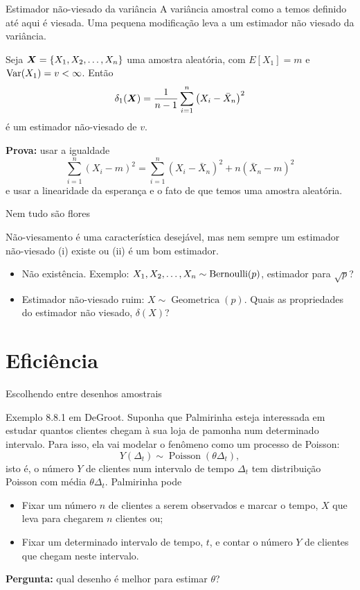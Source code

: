 \begin{frame}{Estimador não-viesado da variância}
A variância amostral como a temos definido até aqui é viesada. 
Uma pequena modificação leva a um estimador não viesado da variância.
\begin{theo}
 Seja $\boldsymbol{X} = \{ X_1, X_2, \ldots, X_n \}$ uma amostra aleatória, com $E[X_1] = m$ e $\operatorname{Var}(X_1) = v < \infty$.
 Então
 \begin{equation*}
  \delta_1(\boldsymbol{X}) = \frac{1}{n-1} \sum_{i=1}^n \left(X_i - \bar{X}_n \right)^2
 \end{equation*}
é um estimador não-viesado de $v$.
\end{theo}
\textbf{Prova:} usar a igualdade
$$ \sum_{i=1}^n \left(X_i - m \right)^2 = \sum_{i=1}^n \left(X_i - \bar{X}_n \right)^2 + n\left(\bar{X}_n - m \right)^2$$
e usar a linearidade da esperança e o fato de que temos uma amostra aleatória.
\end{frame}

\begin{frame}{Nem tudo são flores}

Não-viesamento é uma característica desejável, mas nem sempre um estimador não-viesado (i) existe ou (ii) é um bom estimador.

\begin{itemize}
 \item Não existência.
 Exemplo: $X_1, X_2, \ldots, X_n \sim \operatorname{Bernoulli}(p)$, estimador para $\sqrt{p}$?
 
 \item Estimador não-viesado ruim: $X\sim \operatorname{Geometrica}(p)$.
 Quais as propriedades do estimador não viesado, $\delta(X)$?
\end{itemize}
\end{frame}


\section{Eficiência}

\begin{frame}{Escolhendo entre desenhos amostrais}
\begin{exemplo}
 Exemplo 8.8.1 em DeGroot.
 Suponha que Palmirinha esteja interessada em estudar quantos clientes chegam à sua loja de pamonha num  determinado intervalo.
 Para isso, ela vai modelar o fenômeno como um processo de Poisson:
 $$ Y(\Delta_t) \sim\operatorname{Poisson}(\theta\Delta_t),$$
 isto é, o número $Y$ de clientes num intervalo de tempo $\Delta_t$ tem distribuição Poisson com média $\theta\Delta_t$.
 Palmirinha pode
 \begin{itemize}
  \item Fixar um número $n$ de clientes a serem observados e marcar o tempo, $X$ que leva para chegarem $n$ clientes ou;
  \item Fixar um determinado intervalo de tempo, $t$, e contar o número $Y$ de clientes que chegam neste intervalo.
 \end{itemize}
\textbf{Pergunta:} qual desenho é melhor para estimar $\theta$?
\end{exemplo}
\end{frame}


